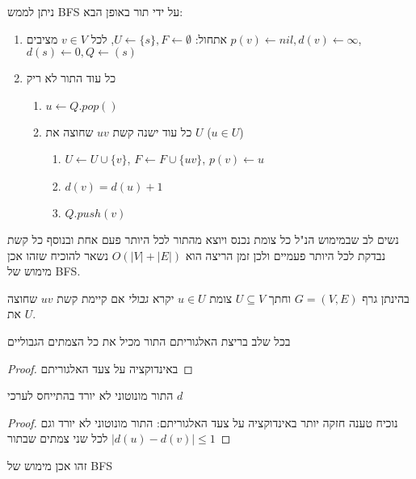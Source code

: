 ניתן לממש BFS על ידי תור באופן הבא:
\begin{enumerate}
\item
אתחול:
$U \leftarrow \{s\}, F \leftarrow \emptyset$, 
לכל 
$v \in V$
מציבים
$p(v) \leftarrow nil, d(v) \leftarrow \infty$,
$d(s) \leftarrow 0, Q \leftarrow (s)$
\item 
כל עוד התור לא ריק 
\begin{enumerate}
	\item
	$u \leftarrow Q.pop()$
\item
כל עוד ישנה קשת 
$uv$
שחוצה את $U$
($u \in U$)
		\begin{enumerate}
		\item
		$U \leftarrow U \cup \{v\}$,
		$F \leftarrow F \cup \{uv\}$,
		$p(v) \leftarrow u$
		\item
		$d(v) = d(u) + 1$
		\item
		$Q.push(v)$
		\end{enumerate}
	\end{enumerate}
\end{enumerate}
נשים לב שבמימוש הנ"ל כל צומת נכנס ויוצא מהתור לכל היותר פעם אחת 
ובנוסף כל קשת נבדקת לכל היותר פעמיים ולכן זמן הריצה הוא 
$O(|V| + |E|)$
נשאר להוכיח שזהו אכן מימוש של BFS.

\begin{definition}
בהינתן גרף 
$G = (V,E)$
וחתך 
$U \subseteq V$
צומת 
$u \in U$
יקרא 
\emph{גבולי}
אם קיימת קשת $uv$ שחוצה את $U$.
\end{definition}

\begin{claim}
בכל שלב בריצת האלגוריתם התור מכיל את כל הצמתים הגבוליים
\end{claim}
\begin{proof}
באינדוקציה על צעד האלגוריתם 
\end{proof}

\begin{claim}
התור מונוטוני לא יורד בהתייחס לערכי 
$d$
\end{claim}
\begin{proof}
נוכיח טענה חזקה יותר באינדוקציה על צעד האלגוריתם: 
התור מונוטוני לא יורד וגם 
$|d(u) - d(v)| \leq 1$
לכל שני צמתים שבתור
\end{proof}

\begin{corollary}
זהו אכן מימוש של BFS
\end{corollary}
